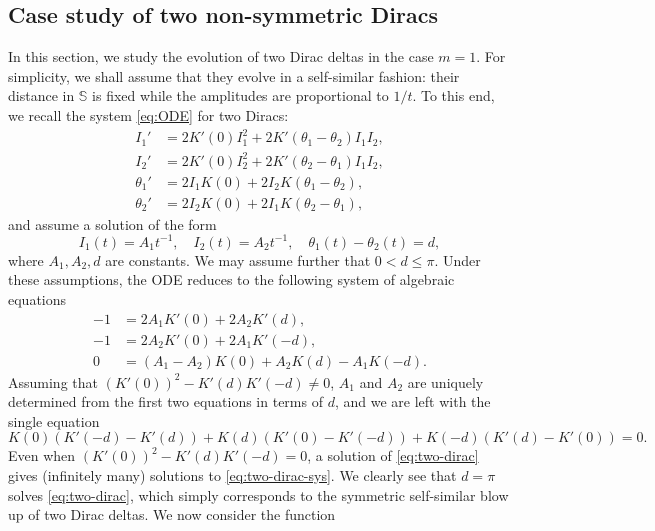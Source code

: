 \documentclass[10pt]{amsart}
\theoremstyle{plain}
\theoremstyle{definition}
\let\tht\theta
\newcommand{\bbS}{\mathbb S}
\begin{document}
\subsection{Case study of two non-symmetric Diracs}\label{subsec:case-study-2}

In this section, we study the evolution of two Dirac deltas in the case $m=1$. For simplicity, we shall assume that they evolve in a self-similar fashion: their distance in $\bbS$ is fixed while the amplitudes are proportional to $1/t$. To this end, we recall the system \eqref{eq:ODE} for two Diracs:\enlargethispage{.5\baselineskip}
\begin{equation*}
\begin{split}
I_1' &= 2K'(0) I_1^2 + 2K'(\tht_1-\tht_2) I_1 I_2, \\
I_2' &= 2K'(0) I_2^2 + 2K'(\tht_2-\tht_1) I_1 I_2, \\
\tht_1 ' &= 2I_1 K(0) + 2I_2 K(\tht_1-\tht_2), \\
\tht_2' &= 2I_2 K(0) + 2I_1 K(\tht_2-\tht_1),
\end{split}
\end{equation*}
and assume a solution of the form
\begin{equation*}
I_1(t)=A_1 t^{-1}, \quad I_2(t)=A_2t^{-1},\quad \tht_1(t)-\tht_2(t) = d,
\end{equation*}
where $A_1,A_2,d$ are constants. We may assume further that $0<d\le \pi$. Under these assumptions, the ODE reduces to the following system of algebraic equations
\begin{equation}\label{eq:two-dirac-sys}
\begin{split}
-1 &= 2A_1 K'(0) + 2A_{2} K'(d), \\
-1 &= 2A_{2} K'(0) + 2A_{1} K'(-d),\\
0 & = (A_{1}-A_{2})K(0) + A_{2} K(d) - A_{1}K(-d).
\end{split}
\end{equation}
Assuming that $(K'(0))^{2} - K'(d)K'(-d) \ne 0$, $A_{1}$ and $A_{2}$ are uniquely determined from the first two equations in terms of $d$, and we are left with the single equation
\begin{equation}\label{eq:two-dirac}
K(0)(K'(-d)-K'(d)) + K(d)(K'(0)-K'(-d)) + K(-d)(K'(d)-K'(0)) = 0.
\end{equation}
Even when $(K'(0))^{2} - K'(d)K'(-d) = 0$, a solution of \eqref{eq:two-dirac} gives (infinitely many) solutions to \eqref{eq:two-dirac-sys}. We clearly see that $d=\pi$ solves \eqref{eq:two-dirac}, which simply corresponds to the symmetric self-similar blow up of two Dirac deltas. We now consider the function\vspace*{-3pt}
\end{document}
